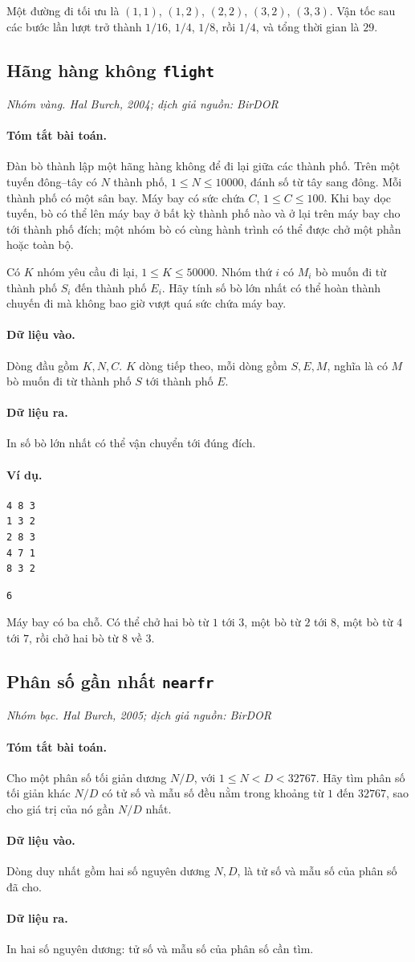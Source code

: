 \documentclass[11pt]{article}
\newcommand{\problem}[4]{%
  \subsection[#1 (#2)]{#1 \hfill {\normalsize\texttt{#2}}}%
  \noindent\textit{#3. #4}\par\smallskip
}
\newcommand{\iosec}[1]{\paragraph{#1}}
\begin{document}
Một đường đi tối ưu là \((1,1)\), \((1,2)\), \((2,2)\), \((3,2)\),
\((3,3)\). Vận tốc sau các bước lần lượt trở thành \(1/16\), \(1/4\),
\(1/8\), rồi \(1/4\), và tổng thời gian là \(29\).

\problem{Hãng hàng không}{flight}{Nhóm vàng}{Hal Burch, 2004; dịch giả nguồn: BirDOR}

\iosec{Tóm tắt bài toán.}
Đàn bò thành lập một hãng hàng không để đi lại giữa các thành phố. Trên một
tuyến đông--tây có \(N\) thành phố, \(1\le N\le 10000\), đánh số từ tây sang
đông. Mỗi thành phố có một sân bay. Máy bay có sức chứa \(C\),
\(1\le C\le 100\). Khi bay dọc tuyến, bò có thể lên máy bay ở bất kỳ thành
phố nào và ở lại trên máy bay cho tới thành phố đích; một nhóm bò có cùng
hành trình có thể được chở một phần hoặc toàn bộ.

Có \(K\) nhóm yêu cầu đi lại, \(1\le K\le 50000\). Nhóm thứ \(i\) có \(M_i\)
bò muốn đi từ thành phố \(S_i\) đến thành phố \(E_i\). Hãy tính số bò lớn
nhất có thể hoàn thành chuyến đi mà không bao giờ vượt quá sức chứa máy bay.

\iosec{Dữ liệu vào.}
Dòng đầu gồm \(K,N,C\). \(K\) dòng tiếp theo, mỗi dòng gồm \(S,E,M\), nghĩa
là có \(M\) bò muốn đi từ thành phố \(S\) tới thành phố \(E\).

\iosec{Dữ liệu ra.}
In số bò lớn nhất có thể vận chuyển tới đúng đích.

\iosec{Ví dụ.}
\begin{verbatim}
4 8 3
1 3 2
2 8 3
4 7 1
8 3 2
\end{verbatim}

\begin{verbatim}
6
\end{verbatim}

Máy bay có ba chỗ. Có thể chở hai bò từ \(1\) tới \(3\), một bò từ \(2\) tới
\(8\), một bò từ \(4\) tới \(7\), rồi chở hai bò từ \(8\) về \(3\).

\problem{Phân số gần nhất}{nearfr}{Nhóm bạc}{Hal Burch, 2005; dịch giả nguồn: BirDOR}

\iosec{Tóm tắt bài toán.}
Cho một phân số tối giản dương \(N/D\), với \(1\le N<D<32767\). Hãy tìm phân
số tối giản khác \(N/D\) có tử số và mẫu số đều nằm trong khoảng từ \(1\) đến
\(32767\), sao cho giá trị của nó gần \(N/D\) nhất.

\iosec{Dữ liệu vào.}
Dòng duy nhất gồm hai số nguyên dương \(N,D\), là tử số và mẫu số của phân số
đã cho.

\iosec{Dữ liệu ra.}
In hai số nguyên dương: tử số và mẫu số của phân số cần tìm.
\end{document}

